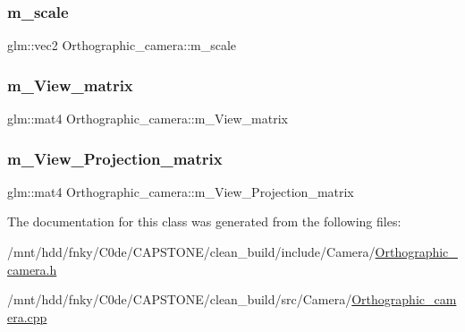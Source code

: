 \subsubsection{\texorpdfstring{m\+\_\+scale}{m\_scale}}
{\footnotesize\ttfamily glm\+::vec2 Orthographic\+\_\+camera\+::m\+\_\+scale\hspace{0.3cm}{\ttfamily [private]}}

\mbox{\label{classOrthographic__camera_aadb603c787908e6b7545baa3367dd0bc}} 
\subsubsection{\texorpdfstring{m\+\_\+\+View\+\_\+matrix}{m\_View\_matrix}}
{\footnotesize\ttfamily glm\+::mat4 Orthographic\+\_\+camera\+::m\+\_\+\+View\+\_\+matrix\hspace{0.3cm}{\ttfamily [private]}}

\mbox{\label{classOrthographic__camera_a3826c2d1b6976581f2d3288432f1b62a}} 
\subsubsection{\texorpdfstring{m\+\_\+\+View\+\_\+\+Projection\+\_\+matrix}{m\_View\_Projection\_matrix}}
{\footnotesize\ttfamily glm\+::mat4 Orthographic\+\_\+camera\+::m\+\_\+\+View\+\_\+\+Projection\+\_\+matrix\hspace{0.3cm}{\ttfamily [private]}}



The documentation for this class was generated from the following files\+:\begin{DoxyCompactItemize}
\item 
/mnt/hdd/fnky/\+C0de/\+C\+A\+P\+S\+T\+O\+N\+E/clean\+\_\+build/include/\+Camera/\hyperlink{Orthographic__camera_8h}{Orthographic\+\_\+camera.\+h}\item 
/mnt/hdd/fnky/\+C0de/\+C\+A\+P\+S\+T\+O\+N\+E/clean\+\_\+build/src/\+Camera/\hyperlink{Orthographic__camera_8cpp}{Orthographic\+\_\+camera.\+cpp}\end{DoxyCompactItemize}

